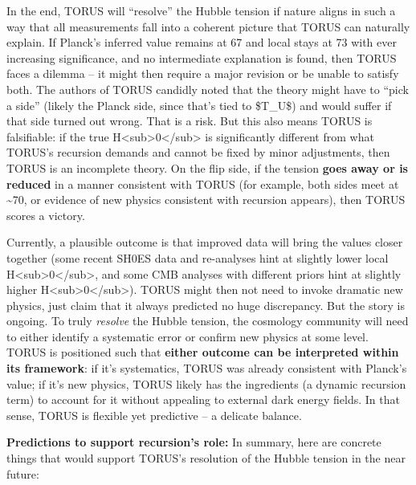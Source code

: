 In the end, TORUS will ``resolve'' the Hubble tension if nature aligns
in such a way that all measurements fall into a coherent picture that
TORUS can naturally explain. If Planck's inferred value remains at 67
and local stays at 73 with ever increasing significance, and no
intermediate explanation is found, then TORUS faces a dilemma -- it
might then require a major revision or be unable to satisfy both. The
authors of TORUS candidly noted that the theory might have to ``pick a
side'' (likely the Planck side, since that's tied to \$T\_U\$) and would
suffer if that side turned out wrong​. That is a risk. But this also
means TORUS is falsifiable: if the true
H\textless{}sub\textgreater{}0\textless{}/sub\textgreater{} is
significantly different from what TORUS's recursion demands and cannot
be fixed by minor adjustments, then TORUS is an incomplete theory. On
the flip side, if the tension \textbf{goes away or is reduced} in a
manner consistent with TORUS (for example, both sides meet at
\textasciitilde{}70, or evidence of new physics consistent with
recursion appears), then TORUS scores a victory​.

Currently, a plausible outcome is that improved data will bring the
values closer together (some recent SH0ES data and re-analyses hint at
slightly lower local
H\textless{}sub\textgreater{}0\textless{}/sub\textgreater{}, and some
CMB analyses with different priors hint at slightly higher
H\textless{}sub\textgreater{}0\textless{}/sub\textgreater{}). TORUS
might then not need to invoke dramatic new physics, just claim that it
always predicted no huge discrepancy. But the story is ongoing. To truly
\emph{resolve} the Hubble tension, the cosmology community will need to
either identify a systematic error or confirm new physics at some level.
TORUS is positioned such that \textbf{either outcome can be interpreted
within its framework}: if it's systematics, TORUS was already consistent
with Planck's value; if it's new physics, TORUS likely has the
ingredients (a dynamic recursion term) to account for it without
appealing to external dark energy fields. In that sense, TORUS is
flexible yet predictive -- a delicate balance.

\textbf{Predictions to support recursion's role:} In summary, here are
concrete things that would support TORUS's resolution of the Hubble
tension in the near future:

